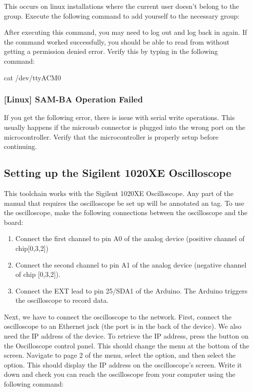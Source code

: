 This occurs on linux installations where the current user doesn't belong to the
 group. Execute the following command to add yourself to the
necessary group:


After executing this command, you may need to log out and log back in again. If
the command worked successfully, you should be able to read from
 without getting a permission denied error. Verify this by
typing in the following command:

\begin{snippet}
cat /dev/ttyACM0
\end{snippet}

\subsubsection{[Linux] SAM-BA Operation Failed}

If you get the following error, there is issue with serial write operations.
This usually happens if the microusb connector is plugged into the wrong port
on the microcontroller. Verify that the microcontroller is properly setup
before continuing.

\subsection{Setting up the Sigilent 1020XE Oscilloscope}
\label{sec:setup-osc}

This toolchain works with the Sigilent 1020XE Oscilloscope. Any part of the
manual that requires the oscilloscope be set up will be annotated 
an \tx{[OSC]} tag. To use the oscilloscope, make the following connections
between the oscilloscope and the board:

\begin{enumerate}
  \item Connect the first channel to pin A0 of the analog device (positive channel of
    chip[0,3,2])
  \item Connect the second channel to pin A1 of the analog device (negative channel of chip
    [0,3,2]).
  \item Connect the EXT lead to pin 25/SDA1 of the Arduino. The Arduino triggers the
    oscilloscope to record data.
\end{enumerate}

Next, we have to connect the oscilloscope to the network. First, connect the
oscilloscope to an Ethernet jack (the port is in the back of the device). We
also need the IP address of the device. To retrieve the IP address, press the
 button on the Oscilloscope control panel. This should change the
menu at the bottom of the screen. Navigate to page 2 of the menu, select the
 option, and then select the  option. This should display
the IP address on the oscilloscope's screen. Write it down and check you can
reach the oscilloscope from your computer using the following command:

